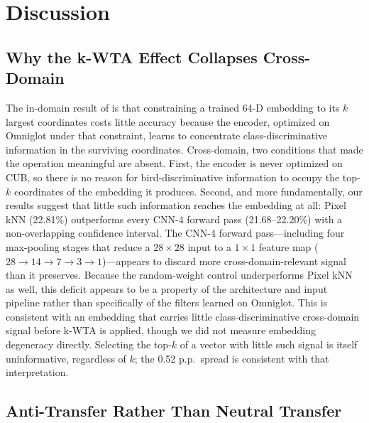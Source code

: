 \documentclass[11pt]{article}
\begin{document}
\section{Discussion}
\label{sec:discussion}

\subsection{Why the k-WTA Effect Collapses Cross-Domain}
\label{subsec:why-collapse}

The in-domain result of \citet{pinho2026kwta} is that constraining a trained 64-D embedding to its $k$ largest coordinates costs little accuracy because the encoder, optimized on Omniglot under that constraint, learns to concentrate class-discriminative information in the surviving coordinates. Cross-domain, two conditions that made the operation meaningful are absent. First, the encoder is never optimized on CUB, so there is no reason for bird-discriminative information to occupy the top-$k$ coordinates of the embedding it produces. Second, and more fundamentally, our results suggest that little such information reaches the embedding at all: Pixel kNN (22.81\%) outperforms every CNN-4 forward pass (21.68--22.20\%) with a non-overlapping confidence interval. The CNN-4 forward pass---including four max-pooling stages that reduce a $28 \times 28$ input to a $1 \times 1$ feature map ($28 \to 14 \to 7 \to 3 \to 1$)---appears to discard more cross-domain-relevant signal than it preserves. Because the random-weight control underperforms Pixel kNN as well, this deficit appears to be a property of the architecture and input pipeline rather than specifically of the filters learned on Omniglot. This is consistent with an embedding that carries little class-discriminative cross-domain signal before k-WTA is applied, though we did not measure embedding degeneracy directly. Selecting the top-$k$ of a vector with little such signal is itself uninformative, regardless of $k$; the 0.52 p.p.\ spread is consistent with that interpretation.

\subsection{Anti-Transfer Rather Than Neutral Transfer}
\label{subsec:anti-transfer-disc}
\end{document}
